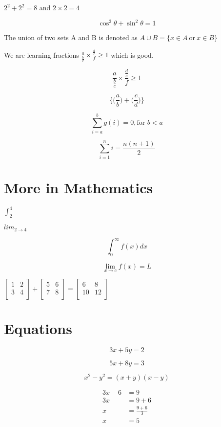 \documentclass{article}
\begin{document}
    \newpage
    $ 2^{2} + 2^{2} = 8$ and $ 2 \times 2 = 4$

    \[ \cos^2 \theta + \sin^2 \theta = 1\]
    
    The union of two sets A and B is denoted as 
    $ A \cup B = \{ x \in A \ \text{or} \ x \in B \} $
    
    We are learning fractions $ \frac{a}{\frac{b}{c}} \times \frac{\frac{d}{e}}{f} \geq 1$ which is good.

    \[ \frac{a}{\frac{b}{c}} \times \frac{\frac{d}{e}}{f} \geq 1\]

    \[ \Bigg\{ \bigg(\frac{a}{b}\bigg) + \bigg(\frac{c}{d}\bigg)\Bigg\} \]

    \[ \sum_{i=a}^{b} g(i) = 0, \text{for } b < a \]

    \[ \sum_{i=1}^{n} i = \frac{n(n+1)}{2} \]

    \section{More in Mathematics}

    $\int_{2}^{4}$

    $lim_{2 \to 4}$

    \[ \int_{0}^{\infty} f(x)dx \]

    \[ \lim_{x \to c} f(x)=L \]

    $
    \begin{bmatrix}
        1 & 2 \\
        3 & 4 \\
    \end{bmatrix}
    +
    \begin{bmatrix}
        5 & 6 \\
        7 & 8 \\
    \end{bmatrix}
    =
    \begin{bmatrix}
        6 & 8 \\
        10 & 12 \\
    \end{bmatrix}
    $

    \section{Equations}
    \begin{equation}
        3x + 5y = 2
    \end{equation}
    
    \begin{equation}
        5x + 8y = 3
    \end{equation}

    \begin{equation}
        x^{2} - y^{2} = (x+y)(x-y)
    \end{equation}

    \begin{align}
        3x - 6 &= 9 \\
        3x &= 9 + 6 \nonumber \\
        x &= \frac{9+6}{3} \nonumber \\
        x &= 5 \nonumber
    \end{align}
\end{document}
